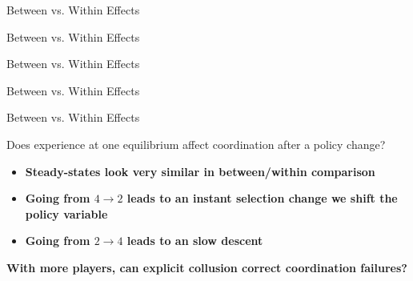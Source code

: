 \documentclass[english]{beamer}
\begin{document}
\begin{frame}{Between vs. Within Effects}
\begin{center}\end{center}
\end{frame}
\begin{frame}{Between vs. Within Effects}
\begin{center}\end{center}
\end{frame}
\begin{frame}{Between vs. Within Effects}
\begin{center}\end{center}
\end{frame}
\begin{frame}{Between vs. Within Effects}
\begin{center}\end{center}
\end{frame}
\begin{frame}{Between vs. Within Effects}
\begin{center}\end{center}
\end{frame}

\begin{frame}
\begin{card}[Question 2:]
Does experience at one equilibrium affect coordination after a policy change?
        \begin{itemize}
            \item \textbf{Steady-states look very similar in between/within comparison}
            \item \textbf{Going from $4\rightarrow 2$ leads to an instant selection change we shift the policy variable}
            \item \textbf{Going from $2\rightarrow 4$ leads to an slow descent}
        \end{itemize}
    \end{card}
\end{frame}

\begin{frame}
\begin{card}[Question 3:]
\textbf{With more players, can explicit collusion correct coordination
        failures?}
\end{card}

\end{frame}
\end{document}
